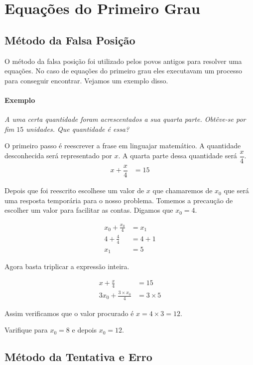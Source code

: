 \chapter{Equações do Primeiro Grau}

\section{Método da Falsa Posição}

O método da falsa posição foi utilizado pelos povos antigos para resolver uma equações. No caso de equações do primeiro grau eles executavam um processo para conseguir encontrar. Vejamos um exemplo disso.

\subsubsection{Exemplo}\textit{A uma certa quantidade foram acrescentados a sua quarta parte. Obtêve-se por fim $15$ unidades. Que quantidade é essa?}

O primeiro passo é reescrever a frase em linguajar matemático. A quantidade desconhecida será representado por $x$. A quarta parte dessa quantidade será $\dfrac{x}{4}$. 
\begin{align}
    x+\dfrac{x}{4}&=15
\end{align}

Depois que foi reescrito escolhese um valor de $x$ que chamaremos de $x_0$ que será uma resposta temporária para o nosso problema. Tomemos a precaução de escolher um valor para facilitar as contas. Digamos que $x_0=4$.

\begin{align}
x_0+\frac{x_0}{4}&=x_1\\
    4+\frac{4}{4}&=4+1\\
    x_1&=5
\end{align}

Agora basta triplicar a expressão inteira.

\begin{align}
x+\frac{x}{4}&=15\\
3x_0 +\frac{3\times x_0}{4}&=3\times 5
\end{align}

Assim verificamos que o valor procurado é $x=4\times 3 = 12$.

Varifique para $x_0=8$ e depois $x_0=12$.

\section{Método da Tentativa e Erro}


